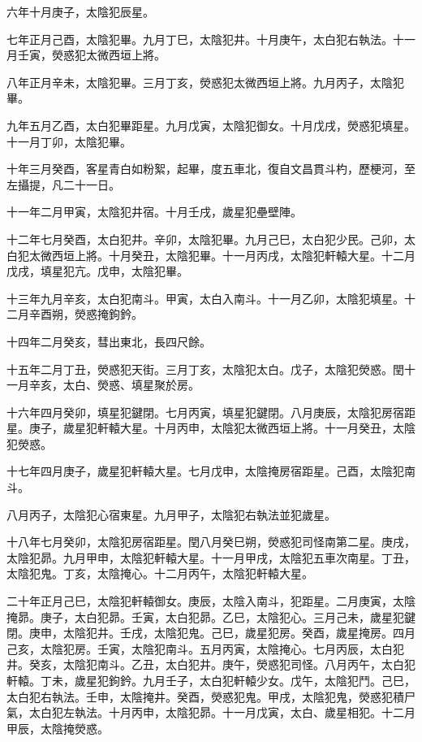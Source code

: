 \begin{pinyinscope}
 六年十月庚子，太陰犯辰星。



 七年正月己酉，太陰犯畢。九月丁巳，太陰犯井。十月庚午，太白犯右執法。十一月壬寅，熒惑犯太微西垣上將。



 八年正月辛未，太陰犯畢。三月丁亥，熒惑犯太微西垣上將。九月丙子，太陰犯畢。



 九年五月乙酉，太白犯畢距星。九月戊寅，太陰犯御女。十月戊戌，熒惑犯填星。十一月丁卯，太陰犯畢。



 十年三月癸酉，客星青白如粉絮，起畢，度五車北，復自文昌貫斗杓，歷梗河，至左攝提，凡二十一日。



 十一年二月甲寅，太陰犯井宿。十月壬戌，歲星犯壘壁陣。



 十二年七月癸酉，太白犯井。辛卯，太陰犯畢。九月己巳，太白犯少民。己卯，太白犯太微西垣上將。十月癸丑，太陰犯畢。十一月丙戌，太陰犯軒轅大星。十二月戊戌，填星犯亢。戊申，太陰犯畢。



 十三年九月辛亥，太白犯南斗。甲寅，太白入南斗。十一月乙卯，太陰犯填星。十二月辛酉朔，熒惑掩鉤鈐。



 十四年二月癸亥，彗出東北，長四尺餘。



 十五年二月丁丑，熒惑犯天街。三月丁亥，太陰犯太白。戊子，太陰犯熒惑。閏十一月辛亥，太白、熒惑、填星聚於房。



 十六年四月癸卯，填星犯鍵閉。七月丙寅，填星犯鍵閉。八月庚辰，太陰犯房宿距星。庚子，歲星犯軒轅大星。十月丙申，太陰犯太微西垣上將。十一月癸丑，太陰犯熒惑。



 十七年四月庚子，歲星犯軒轅大星。七月戊申，太陰掩房宿距星。己酉，太陰犯南斗。



 八月丙子，太陰犯心宿東星。九月甲子，太陰犯右執法並犯歲星。



 十八年七月癸卯，太陰犯房宿距星。閏八月癸巳朔，熒惑犯司怪南第二星。庚戌，太陰犯昴。九月甲申，太陰犯軒轅大星。十一月甲戌，太陰犯五車次南星。丁丑，太陰犯鬼。丁亥，太陰掩心。十二月丙午，太陰犯軒轅大星。



 二十年正月己巳，太陰犯軒轅御女。庚辰，太陰入南斗，犯距星。二月庚寅，太陰掩昴。庚子，太白犯昴。壬寅，太白犯昴。乙巳，太陰犯心。三月己未，歲星犯鍵閉。庚申，太陰犯井。壬戌，太陰犯鬼。己巳，歲星犯房。癸酉，歲星掩房。四月己亥，太陰犯房。壬寅，太陰犯南斗。五月丙寅，太陰掩心。七月丙辰，太白犯井。癸亥，太陰犯南斗。乙丑，太白犯井。庚午，熒惑犯司怪。八月丙午，太白犯軒轅。丁未，歲星犯鉤鈐。九月壬子，太白犯軒轅少女。戊午，太陰犯鬥。己巳，太白犯右執法。壬申，太陰掩井。癸酉，熒惑犯鬼。甲戌，太陰犯鬼，熒惑犯積尸氣，太白犯左執法。十月丙申，太陰犯昴。十一月戊寅，太白、歲星相犯。十二月甲辰，太陰掩熒惑。




\end{pinyinscope}
